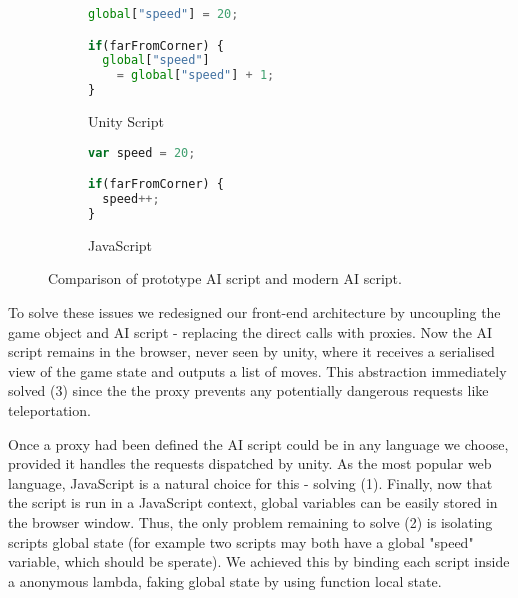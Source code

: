 \begin{figure}[H]
\centering
\begin{subfigure}{.5\textwidth}
  \centering
\begin{lstlisting}[language=JavaScript]  
global["speed"] = 20;

if(farFromCorner) {
  global["speed"] 
    = global["speed"] + 1;
}

\end{lstlisting}
  \caption{Unity Script}
  \label{fig:sub1}
\end{subfigure}%
\begin{subfigure}{.5\textwidth}
  \centering
\begin{lstlisting}[language=JavaScript]  
var speed = 20;

if(farFromCorner) {
  speed++;
}
\end{lstlisting}
  \caption{JavaScript}
  \label{fig:sub2}
\end{subfigure}
\caption{Comparison of prototype AI script and modern AI script.}
\label{fig:unityvsjava}
\end{figure}

To solve these issues we redesigned our front-end architecture by uncoupling the game object and AI script - replacing the direct calls with proxies. Now the AI script remains in the browser, never seen by unity, where it receives a serialised view of the game state and outputs a list of moves. This abstraction immediately solved (3) since the the proxy prevents any potentially dangerous requests like teleportation. 

Once a proxy had been defined the AI script could be in any language we choose, provided it handles the requests dispatched by unity. As the most popular web language, JavaScript is a natural choice for this - solving (1). Finally, now that the script is run in a JavaScript context, global variables can be easily stored in the browser window. Thus, the only problem remaining to solve (2) is isolating scripts global state (for example two scripts may both have a global "speed" variable, which should be sperate). We achieved this by binding each script inside a anonymous lambda, faking global state by using function local state.